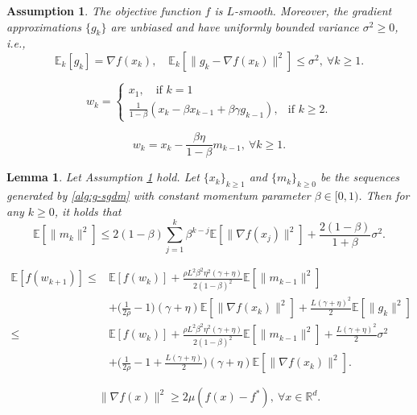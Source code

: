 \documentclass[10pt,a4paper]{amsart}
\newtheorem{assumption}{Assumption}
\newtheorem{lemma}{Lemma}
\newcommand{\ebb}{\mathbb{E}}  %
\newcommand{\rbb}{\mathbb{R}}  %
\begin{document}
\begin{assumption}\label{ass:s-bv}
    The objective function $f$ is $L$-smooth. Moreover, the gradient approximations $\{g_k\}$ are unbiased and have uniformly bounded variance $\sigma^2\ge 0$, i.e.,
    \[
    \ebb_k[g_k]=\nabla f(x_k),\quad \ebb_k[\|g_k-\nabla f(x_k)\|^2]\leq \sigma^2,~\forall k\ge 1.
    \]
\end{assumption}

\begin{equation}\label{def:wk}
w_k= \begin{cases}x_1, \quad \text{if } k=1 &  \\ \frac{1}{1-\beta} (x_k-\beta x_{k-1}+\beta \gamma g_{k-1}), & \text{if } k \ge 2.\end{cases}
\end{equation}

\begin{equation}\label{eq:wk-xk}
    w_k=x_k-\frac{\beta\eta}{1-\beta} m_{k-1},~\forall k\ge 1.
\end{equation}

\begin{lemma}\label{lem:m-var}
Let Assumption \ref{ass:s-bv} hold. Let $\{x_k\}_{k\ge 1}$ and $\{m_k\}_{k\ge 0}$ be the sequences generated by \eqref{alg:g-sgdm} with constant momentum parameter $\beta\in [0,1)$. Then for any $k\ge 0$, it holds that
\[
\ebb[\|m_k\|^2] \leq 2(1-\beta) \sum_{j=1}^k \beta^{k-j}\ebb[\|\nabla f(x_j)\|^2]+\frac{2(1-\beta)}{1+\beta} \sigma^2.
\]
\end{lemma}

\begin{equation}\label{eq:nc-3}
\begin{aligned}
\ebb[f(w_{k+1})] \leq & \ebb[f(w_k)]+\frac{\rho L^2\beta^2\eta^2(\gamma+\eta)}{2(1-\beta)^2}  \ebb[\|m_{k-1}\|^2] \\
& +\Big(\frac{1}{2 \rho}-1\Big)(\gamma+\eta) \ebb[\|\nabla f(x_k)\|^2]+\frac{L (\gamma+\eta)^2}{2} \ebb[\|g_k\|^2]\\
\leq & \ebb[f(w_k)]+\frac{\rho L^2\beta^2\eta^2(\gamma+\eta)}{2(1-\beta)^2} \ebb[\|m_{k-1}\|^2]+\frac{L(\gamma+\eta)^2}{2} \sigma^2 \\
& +\Big(\frac{1}{2 \rho}-1+\frac{L(\gamma+\eta)}{2}\Big)(\gamma+\eta) \ebb[\|\nabla f(x_k)\|^2].
\end{aligned}
\end{equation}

\begin{equation}\label{eq:pl-condition}
\| \nabla f(x) \|^2 \ge 2 \mu(f(x)-f^*),~\forall x\in\rbb^d.
\end{equation}
\end{document}
